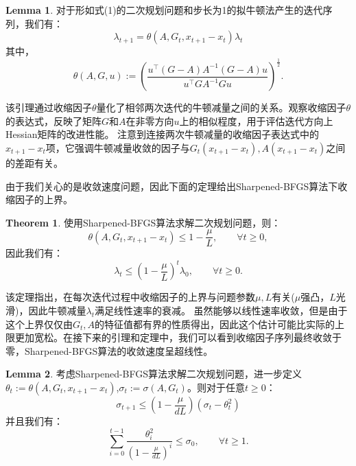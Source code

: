 \documentclass[a4paper,twoside,AutoFakeBold]{article}
\theoremstyle{definition}
\newtheorem{thrm2}{{Theorem}}
\newtheorem{lema2}{{Lemma}}
\begin{document}
\begin{lema2}\label{lema:theone}
    对于形如式(1)的二次规划问题和步长为1的拟牛顿法产生的迭代序列，我们有：
    \begin{equation}
        \lambda_{t+1}=\theta(A,G_t,x_{t+1}-x_t)\lambda_t
    \end{equation}
    其中，
    \begin{equation}
        \theta(A,G,u) := \left(\frac{u^\top (G - A) A^{-1} (G - A) u}{u^\top G A^{-1} G u}\right)^{\frac{1}{2}}.
    \end{equation}
\end{lema2}

该引理通过收缩因子$\theta$量化了相邻两次迭代的牛顿减量之间的关系。观察收缩因子$\theta$的表达式，反映了矩阵$G$和$A$在非零方向$u$上的相似程度，用于评估迭代方向上Hessian矩阵的改进性能。
注意到连接两次牛顿减量的收缩因子表达式中的$x_{t+1}-x_t$项，它强调牛顿减量收敛的因子与$G_t(x_{t+1}-x_t),A(x_{t+1}-x_t)$之间的差距有关。

由于我们关心的是收敛速度问题，因此下面的定理给出Sharpened-BFGS算法下收缩因子的上界。

\begin{thrm2}
    使用Sharpened-BFGS算法求解二次规划问题，则：
    \begin{equation}
        \theta(A, G_t, x_{t + 1} - x_{t})\leq 1 - \frac{\mu}{L}, \qquad \forall t \geq 0,
    \end{equation}
    因此我们有：
    \begin{equation}
        \lambda_t \leq \left(1 - \frac{\mu}{L}\right)^{t}\lambda_0, \qquad \forall t \geq 0.
    \end{equation}
\end{thrm2}

该定理指出，在每次迭代过程中收缩因子的上界与问题参数$\mu,L$有关($\mu$强凸，$L$光滑)，因此牛顿减量$\lambda_t$满足线性速率的衰减。
虽然能够以线性速率收敛，但是由于这个上界仅仅由$G_t,A$的特征值都有界的性质得出，因此这个估计可能比实际的上限更加宽松。在接下来的引理和定理中，我们可以看到收缩因子序列最终收敛于零，Sharpened-BFGS算法的收敛速度呈超线性。

\begin{lema2}
    考虑Sharpened-BFGS算法求解二次规划问题，进一步定义$\theta_t:=\theta(A, G_t, x_{t + 1} - x_{t})$,$\sigma_t := \sigma(A, G_t)$。则对于任意$t\ge 0$：
    \begin{equation}
        \sigma_{t+1} \leq \left(1 - \frac{\mu}{dL}\right)\left(\sigma_t - \theta_t^2\right)
    \end{equation}
    并且我们有：
    \begin{equation}
        \sum_{i = 0}^{t - 1}\frac{\theta^2_i}{(1 - \frac{\mu}{d L})^{i}}  \leq \sigma_0, \qquad \forall t \geq 1. 
    \end{equation}
\end{lema2}
\end{document}
